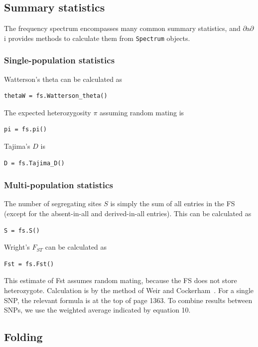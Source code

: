 \documentclass[12pt]{article}
\makeatletter
\newcommand{\dadi}{$\partial$a$\partial$i\xspace}
\newcommand{\py}[1]{\lstinline[language=Python, showstringspaces=False]@#1@}
\makeatother
\begin{document}
\subsection{Summary statistics}

The frequency spectrum encompasses many common summary statistics, and \dadi provides methods to calculate them from \py{Spectrum} objects.

\subsubsection{Single-population statistics}

Watterson's theta can be calculated as
\begin{lstlisting}
thetaW = fs.Watterson_theta()
\end{lstlisting}

The expected heterozygosity $\pi$ assuming random mating is
\begin{lstlisting}
pi = fs.pi()
\end{lstlisting}

Tajima's $D$ is
\begin{lstlisting}
D = fs.Tajima_D()
\end{lstlisting}

\subsubsection{Multi-population statistics}

The number of segregating sites $S$ is simply the sum of all entries in the FS (except for the absent-in-all and derived-in-all entries).
This can be calculated as
\begin{lstlisting}
S = fs.S()
\end{lstlisting}

Wright's $F_{ST}$ can be calculated as
\begin{lstlisting}
Fst = fs.Fst()
\end{lstlisting}
This estimate of Fst assumes random mating, because the FS does not store heterozygote.
Calculation is by the method of Weir and Cockerham~\cite{bib:Weir1984}.
For a single SNP, the relevant formula is at the top of page 1363.
To combine results between SNPs, we use the weighted average indicated by equation 10.

\subsection{Folding}
\end{document}
